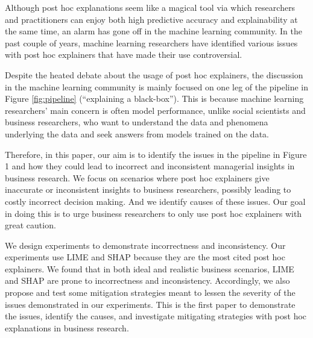 \documentclass[12pt]{article}    %
\begin{document}
Although post hoc explanations seem like a magical tool via which researchers and practitioners can enjoy both high predictive accuracy and explainability at the same time, an alarm has gone off in the machine learning community. In the past couple of years, machine learning researchers have identified various issues with post hoc explainers that have made their use controversial.

Despite the heated debate about the usage of post hoc explainers, the discussion in the machine learning community is mainly focused on one leg of the pipeline in Figure \ref{fig:pipeline}  (``explaining a black-box''). This is because machine learning researchers' main concern is often model performance, unlike social scientists and business researchers, who want to understand the data and phenomena underlying the data and seek answers from models trained on the data. 

Therefore, in this paper, our aim is to identify the issues in the pipeline in Figure 1 and how they could lead to incorrect and inconsistent managerial insights in business research. We focus on scenarios where post hoc explainers give inaccurate or inconsistent insights to business researchers, possibly leading to costly incorrect decision making. And we identify causes of these issues. Our goal in doing this is to urge business researchers to only use post hoc explainers with great caution. 

We design experiments to demonstrate incorrectness and inconsistency. Our experiments use LIME and SHAP because they are the most cited post hoc explainers. We found that in both ideal and realistic business scenarios, LIME and SHAP are prone to incorrectness and inconsistency. Accordingly, we also propose and test some mitigation strategies meant to lessen the severity of the issues demonstrated in our experiments. This is the first paper to demonstrate the issues, identify the causes, and investigate mitigating strategies with post hoc explanations in business research.%
\end{document}
